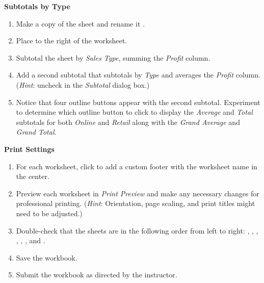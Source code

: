 \noindent
\textbf{Subtotals by Type}

\begin{enumerate}[resume]
	\item Make a copy of the  sheet and rename it . 
	\item Place  to the right of the  worksheet. 
	\item Subtotal the sheet by \textit{Sales Type}, summing the \textit{Profit} column.
	\item Add a second subtotal that subtotals by \textit{Type} and averages the \textit{Profit} column. (\textit{Hint}: uncheck  in the \textit{Subtotal} dialog box.) 
	\item Notice that four outline buttons appear with the second subtotal. Experiment to determine which outline button to click to display the \textit{Average} and \textit{Total} subtotals for both \textit{Online} and \textit{Retail} along with the \textit{Grand Average} and \textit{Grand Total}.
\end{enumerate}

\noindent
\textbf{Print Settings}

\begin{enumerate}[resume]
	\item For each worksheet, click  to add a custom footer with the worksheet name in the center.
	\item Preview each worksheet in \textit{Print Preview} and make any necessary changes for professional printing. (\textit{Hint}: Orientation, page scaling, and print titles might need to be adjusted.)
	\item Double-check that the sheets are in the following order from left to right: , , , , , , and .
	\item Save the  workbook.
	\item Submit the  workbook as directed by the instructor.
\end{enumerate}
